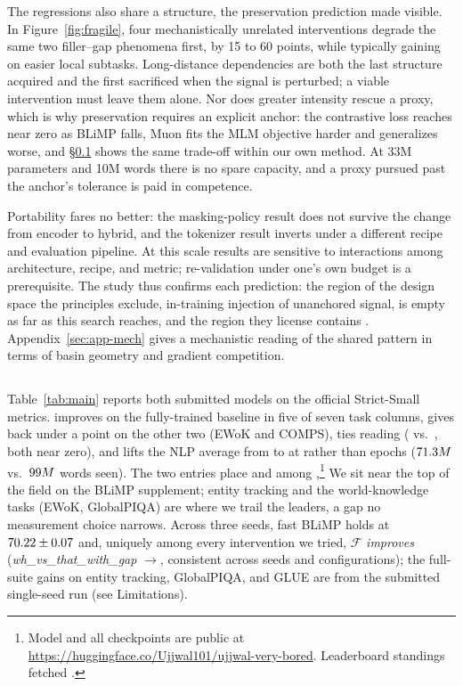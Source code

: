 The regressions also share a structure, the preservation prediction made
visible. In Figure~\ref{fig:fragile}, four mechanistically unrelated
interventions degrade the same two filler--gap phenomena first, by 15 to 60
points, while typically gaining on easier local subtasks. Long-distance
dependencies are both the last structure acquired and the first sacrificed
when the signal is perturbed; a viable intervention must leave them
alone. Nor does greater intensity rescue a proxy, which is why
preservation requires an explicit anchor: the contrastive loss reaches
near zero as BLiMP falls, Muon fits the MLM objective harder and
generalizes worse, and \S\ref{sec:results-mpo} shows the same trade-off
within our own method. At 33M parameters and 10M words there is no spare
capacity, and a proxy pursued past the anchor's tolerance is paid in
competence.

Portability fares no better: the masking-policy result does not survive
the change from encoder to hybrid, and the tokenizer result inverts under
a different recipe and evaluation pipeline. At this scale results are
sensitive to interactions among architecture, recipe, and metric;
re-validation under one's own budget is a prerequisite. The study thus confirms each prediction: the region of
the design space the principles exclude, in-training injection of
unanchored signal, is empty as far as this search reaches, and the region
they license contains \MPO{}. Appendix~\ref{sec:app-mech} gives a
mechanistic reading of the shared pattern in terms of basin geometry and
gradient competition.

\subsection{\MPO{}}
\label{sec:results-mpo}
Table~\ref{tab:main} reports both submitted models on the official
Strict-Small metrics. \MPO{} improves on the fully-trained baseline in five
of seven task columns, gives back under a point on the other two (EWoK and
COMPS), ties reading (\rReadDpo{} vs.\ \rReadBase{}, both near zero), and
lifts the NLP average from \rNlpBase{} to \rNlpDpo{} at \rDpoEpochs{}
rather than
\rEpochs{} epochs ($71.3M$ vs.\ $99M$ words seen). The two
entries place \rRankDpo{} and \rRankBase{} among
\rFieldSize{},\footnote{Model and all checkpoints are public at
\url{https://huggingface.co/Ujjwal101/ujjwal-very-bored}. Leaderboard
standings fetched \rBoardFetch{}.} We sit near the top of the field on the
BLiMP supplement; entity tracking and the world-knowledge tasks
(EWoK, GlobalPIQA) are where we trail the leaders, a gap no measurement
choice narrows. Across three seeds,
fast BLiMP holds at $70.22\pm0.07$ and, uniquely among
every intervention we tried, $\mathcal{F}$ \emph{improves}
(\emph{wh\_vs\_that\_with\_gap}
\rWhGapBase{}$\rightarrow$\rWhGapDpo{}, consistent across seeds and
configurations); the full-suite gains on entity tracking, GlobalPIQA, and
GLUE are from the submitted single-seed run (see Limitations).

